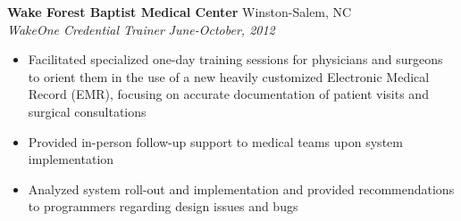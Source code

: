 \documentclass[11pt]{article}
\begin{document}
\noindent
{\bf Wake Forest Baptist Medical Center} \hfill Winston-Salem, NC\\
{\it WakeOne Credential Trainer} \hfill {\it June-October, 2012}

\begin{itemize}
\setlength{\itemsep}{1pt}

\item Facilitated specialized one-day training sessions for physicians
and surgeons to orient them in the use of a new heavily customized Electronic
Medical Record (EMR), focusing on accurate documentation of patient visits
and surgical consultations

\item Provided in-person follow-up support to medical teams upon system
implementation

\item Analyzed system roll-out and implementation and provided
recommendations to programmers regarding design issues and bugs

\end{itemize}
\vspace{1pt}


%


%
%
%
\end{document}
